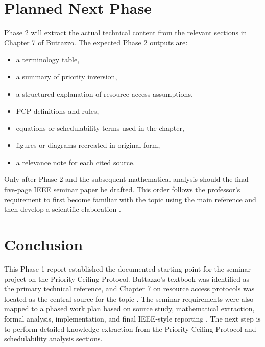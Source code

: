 \documentclass[conference]{IEEEtran}
\begin{document}
\section{Planned Next Phase}
Phase 2 will extract the actual technical content from the relevant sections in Chapter 7 of Buttazzo. The expected Phase 2 outputs are:
\begin{itemize}
    \item a terminology table,
    \item a summary of priority inversion,
    \item a structured explanation of resource access assumptions,
    \item PCP definitions and rules,
    \item equations or schedulability terms used in the chapter,
    \item figures or diagrams recreated in original form,
    \item a relevance note for each cited source.
\end{itemize}

Only after Phase 2 and the subsequent mathematical analysis should the final five-page IEEE seminar paper be drafted. This order follows the professor's requirement to first become familiar with the topic using the main reference and then develop a scientific elaboration \cite{HenklerSeminar2026}.

\section{Conclusion}
This Phase 1 report established the documented starting point for the seminar project on the Priority Ceiling Protocol. Buttazzo's textbook was identified as the primary technical reference, and Chapter 7 on resource access protocols was located as the central source for the topic \cite{Buttazzo2011}. The seminar requirements were also mapped to a phased work plan based on source study, mathematical extraction, formal analysis, implementation, and final IEEE-style reporting \cite{HenklerSeminar2026}. The next step is to perform detailed knowledge extraction from the Priority Ceiling Protocol and schedulability analysis sections.



\end{document}
